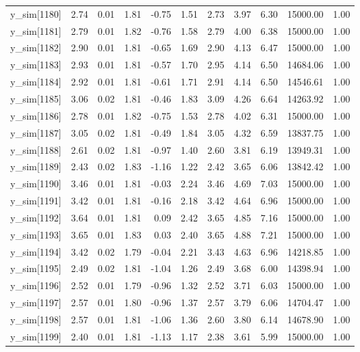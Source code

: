 \begin{table}[ht]
\begin{tabular}{rrrrrrrrrrr}
  y\_sim[1180] & 2.74 & 0.01 & 1.81 & -0.75 & 1.51 & 2.73 & 3.97 & 6.30 & 15000.00 & 1.00 \\ 
  y\_sim[1181] & 2.79 & 0.01 & 1.82 & -0.76 & 1.58 & 2.79 & 4.00 & 6.38 & 15000.00 & 1.00 \\ 
  y\_sim[1182] & 2.90 & 0.01 & 1.81 & -0.65 & 1.69 & 2.90 & 4.13 & 6.47 & 15000.00 & 1.00 \\ 
  y\_sim[1183] & 2.93 & 0.01 & 1.81 & -0.57 & 1.70 & 2.95 & 4.14 & 6.50 & 14684.06 & 1.00 \\ 
  y\_sim[1184] & 2.92 & 0.01 & 1.81 & -0.61 & 1.71 & 2.91 & 4.14 & 6.50 & 14546.61 & 1.00 \\ 
  y\_sim[1185] & 3.06 & 0.02 & 1.81 & -0.46 & 1.83 & 3.09 & 4.26 & 6.64 & 14263.92 & 1.00 \\ 
  y\_sim[1186] & 2.78 & 0.01 & 1.82 & -0.75 & 1.53 & 2.78 & 4.02 & 6.31 & 15000.00 & 1.00 \\ 
  y\_sim[1187] & 3.05 & 0.02 & 1.81 & -0.49 & 1.84 & 3.05 & 4.32 & 6.59 & 13837.75 & 1.00 \\ 
  y\_sim[1188] & 2.61 & 0.02 & 1.81 & -0.97 & 1.40 & 2.60 & 3.81 & 6.19 & 13949.31 & 1.00 \\ 
  y\_sim[1189] & 2.43 & 0.02 & 1.83 & -1.16 & 1.22 & 2.42 & 3.65 & 6.06 & 13842.42 & 1.00 \\ 
  y\_sim[1190] & 3.46 & 0.01 & 1.81 & -0.03 & 2.24 & 3.46 & 4.69 & 7.03 & 15000.00 & 1.00 \\ 
  y\_sim[1191] & 3.42 & 0.01 & 1.81 & -0.16 & 2.18 & 3.42 & 4.64 & 6.96 & 15000.00 & 1.00 \\ 
  y\_sim[1192] & 3.64 & 0.01 & 1.81 & 0.09 & 2.42 & 3.65 & 4.85 & 7.16 & 15000.00 & 1.00 \\ 
  y\_sim[1193] & 3.65 & 0.01 & 1.83 & 0.03 & 2.40 & 3.65 & 4.88 & 7.21 & 15000.00 & 1.00 \\ 
  y\_sim[1194] & 3.42 & 0.02 & 1.79 & -0.04 & 2.21 & 3.43 & 4.63 & 6.96 & 14218.85 & 1.00 \\ 
  y\_sim[1195] & 2.49 & 0.02 & 1.81 & -1.04 & 1.26 & 2.49 & 3.68 & 6.00 & 14398.94 & 1.00 \\ 
  y\_sim[1196] & 2.52 & 0.01 & 1.79 & -0.96 & 1.32 & 2.52 & 3.71 & 6.03 & 15000.00 & 1.00 \\ 
  y\_sim[1197] & 2.57 & 0.01 & 1.80 & -0.96 & 1.37 & 2.57 & 3.79 & 6.06 & 14704.47 & 1.00 \\ 
  y\_sim[1198] & 2.57 & 0.01 & 1.81 & -1.06 & 1.36 & 2.60 & 3.80 & 6.14 & 14678.90 & 1.00 \\ 
  y\_sim[1199] & 2.40 & 0.01 & 1.81 & -1.13 & 1.17 & 2.38 & 3.61 & 5.99 & 15000.00 & 1.00 \\ 

\end{tabular}
\end{table}
